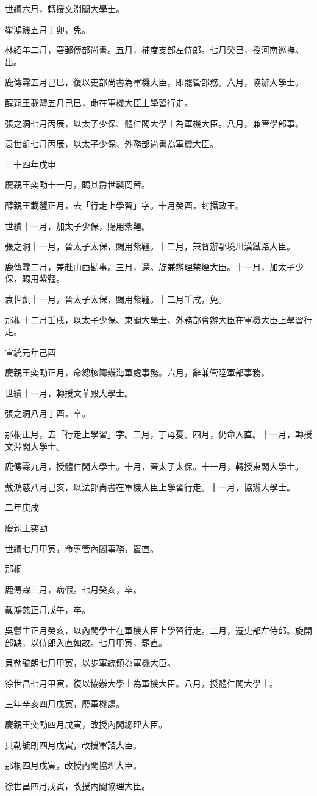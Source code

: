 \begin{pinyinscope}
世續六月，轉授文淵閣大學士。

瞿鴻禨五月丁卯，免。

林紹年二月，署郵傳部尚書。五月，補度支部左侍郎。七月癸巳，授河南巡撫。出。

鹿傳霖五月己巳，復以吏部尚書為軍機大臣，即罷管部務。六月，協辦大學士。

醇親王載灃五月己巳，命在軍機大臣上學習行走。

張之洞七月丙辰，以太子少保、體仁閣大學士為軍機大臣。八月，兼管學部事。

袁世凱七月丙辰，以太子少保、外務部尚書為軍機大臣。

三十四年戊申

慶親王奕劻十一月，賜其爵世襲罔替。

醇親王載灃正月，去「行走上學習」字。十月癸酉，封攝政王。

世續十一月，加太子少保，賜用紫韁。

張之洞十一月，晉太子太保，賜用紫韁。十二月，兼督辦鄂境川漢鐵路大臣。

鹿傳霖二月，差赴山西勘事。三月，還。旋兼辦理禁煙大臣。十一月，加太子少保，賜用紫韁。

袁世凱十一月，晉太子太保，賜用紫韁。十二月壬戌，免。

那桐十二月壬戌，以太子少保、東閣大學士、外務部會辦大臣在軍機大臣上學習行走。

宣統元年己酉

慶親王奕劻正月，命總核籌辦海軍處事務。六月，辭兼管陸軍部事務。

世續十一月，轉授文華殿大學士。

張之洞八月丁酉，卒。

那桐正月，去「行走上學習」字。二月，丁母憂。四月，仍命入直。十一月，轉授文淵閣大學士。

鹿傳霖九月，授體仁閣大學士。十月，晉太子太保。十一月，轉授東閣大學士。

戴鴻慈八月己亥，以法部尚書在軍機大臣上學習行走。十一月，協辦大學士。

二年庚戌

慶親王奕劻

世續七月甲寅，命專管內閣事務，置直。

那桐

鹿傳霖三月，病假。七月癸亥，卒。

戴鴻慈正月戊午，卒。

吳鬱生正月癸亥，以內閣學士在軍機大臣上學習行走。二月，遷吏部左侍郎。旋開部缺，以侍郎入直如故。七月甲寅，罷直。

貝勒毓朗七月甲寅，以步軍統領為軍機大臣。

徐世昌七月甲寅，復以協辦大學士為軍機大臣。八月，授體仁閣大學士。

三年辛亥四月戊寅，廢軍機處。

慶親王奕劻四月戊寅，改授內閣總理大臣。

貝勒毓朗四月戊寅，改授軍諮大臣。

那桐四月戊寅，改授內閣協理大臣。

徐世昌四月戊寅，改授內閣協理大臣。


\end{pinyinscope}